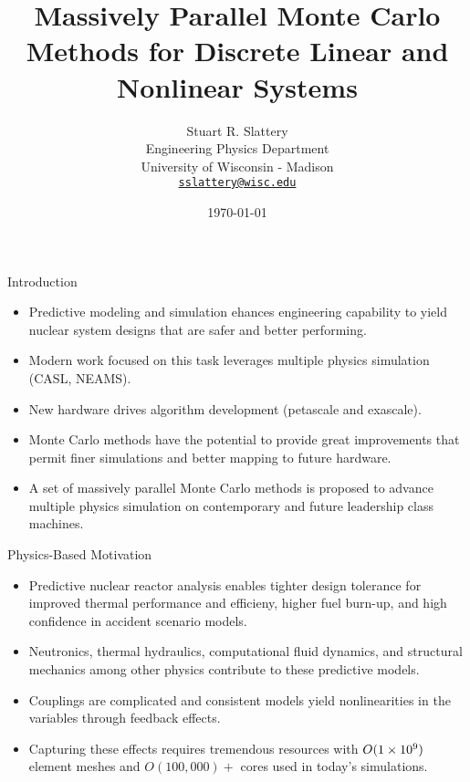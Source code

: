 \documentclass{beamer}
\author{Stuart R. Slattery
  \\ Engineering Physics Department
  \\ University of Wisconsin - Madison
  \\ \href{mailto:sslattery@wisc.edu}{\texttt{sslattery@wisc.edu}}
}
\date{\today}
\title{Massively Parallel Monte Carlo Methods for Discrete Linear and
  Nonlinear Systems}
\begin{document}
\maketitle

\begin{frame}{Introduction}
  \begin{itemize}
    \item Predictive modeling and simulation ehances engineering
      capability to yield nuclear system designs that are safer and
      better performing.
    \item Modern work focused on this task leverages multiple physics
      simulation (CASL, NEAMS).
    \item New hardware drives algorithm development (petascale and
      exascale).
    \item Monte Carlo methods have the potential to provide great
      improvements that permit finer simulations and better mapping to
      future hardware.
    \item A set of massively parallel Monte Carlo methods is proposed
      to advance multiple physics simulation on contemporary and
      future leadership class machines.
  \end{itemize}
\end{frame}

\begin{frame}{Physics-Based Motivation}
  \begin{itemize}
    \item Predictive nuclear reactor analysis enables tighter design
      tolerance for improved thermal performance and efficieny, higher
      fuel burn-up, and high confidence in accident scenario models.
    \item Neutronics, thermal hydraulics, computational fluid
      dynamics, and structural mechanics among other physics
      contribute to these predictive models.
    \item Couplings are complicated and consistent models yield
      nonlinearities in the variables through feedback effects.
    \item  Capturing  these   effects  requires  tremendous  resources
      with $O(1\times 10^{9})$ element meshes and $O(100,000)+$ cores used
      in today's simulations.
  \end{itemize}
\end{frame}
\end{document}
